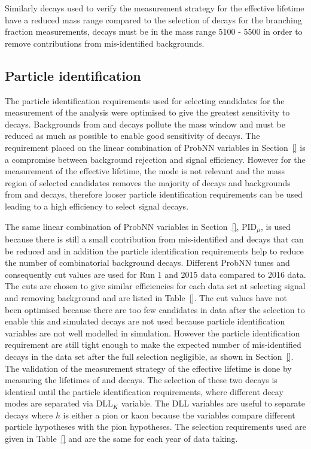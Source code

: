 Similarly \bhh decays used to verify the measurement strategy for the \bsmumu effective lifetime have a reduced mass range compared to the selection of \bhh decays for the branching fraction measurements, \bhh decays must be in the mass range 5100 - 5500 \mevcc in order to remove contributions from mis-identified backgrounds.

\subsection{Particle identification}
\label{sec:ELpid}
The particle identification requirements used for selecting candidates for the measurement of the \BF analysis were optimised to give the greatest sensitivity to \bdmumu decays. Backgrounds from \bhh and \lambdab decays pollute the \bd mass window and must be reduced as much as possible to enable good sensitivity of \bdmumu decays. The requirement placed on the linear combination of ProbNN variables in Section~\ref{} is a compromise between background rejection and signal efficiency. However for the measurement of the \bsmumu effective lifetime, the \bd mode is not relevant and the mass region of selected candidates removes the majority of \bdmumu decays and backgrounds from \bhh and \lambdab decays, therefore looser particle identification requirements can be used leading to a high efficiency to select signal decays.  

The same linear combination of ProbNN variables in Section~\ref{}, PID$_{\mu}$, is used because there is still a small contribution from mis-identified \bhh and \lambdab decays that can be reduced and in addition the particle identification requirements help to reduce the number of combinatorial background decays. Different ProbNN tunes and consequently cut values are used for Run 1 and 2015 data compared to 2016 data. The cuts are chosen to give similar efficiencies for each data set at selecting signal and removing background and are listed in Table~\ref{}. The cut values have not been optimised because there are too few candidates in data after the selection to enable this and simulated decays are not used because particle identification variables are not well modelled in simulation. However the particle identification requirement are still tight enough to make the expected number of mis-identified decays in the data set after the full selection negligible, as shown in Section~\ref{}. 
The validation of the measurement strategy of the \bsmumu effective lifetime is done by measuring the lifetimes of \bdkpi and \bskk decays. The selection of these two \bhh decays is identical until the particle identification requirements, where different decay modes are separated via DLL$_{K}$ variable. The DLL variables are useful to separate \bhh decays where $h$ is either a pion or kaon because the variables compare different particle hypotheses with the pion hypotheses. The selection requirements used are given in Table~\ref{} and are the same for each year of data taking.


